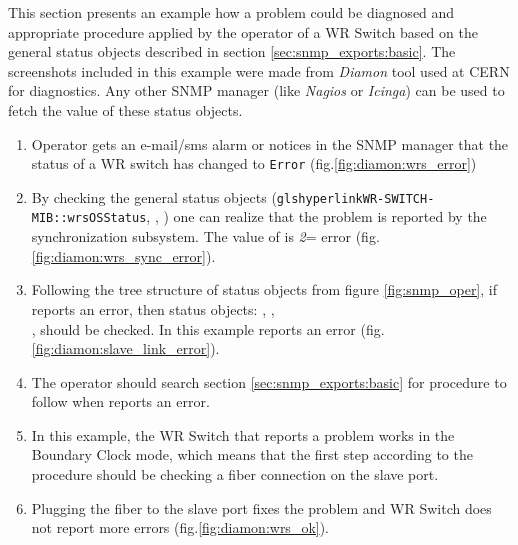 This section presents an example how a problem could be diagnosed and
appropriate procedure applied by the operator of a WR Switch based on the
general status objects described in section \ref{sec:snmp_exports:basic}. The
screenshots included in this example were made from \emph{Diamon} tool used at
CERN for diagnostics. Any other SNMP manager (like \emph{Nagios} or
\emph{Icinga}) can be used to fetch the value of these status objects.

\begin{enumerate}
  \item Operator gets an e-mail/sms alarm or notices in the SNMP manager that
    the status of a WR switch has changed to \texttt{Error}
    (fig.\ref{fig:diamon:wrs_error})
  \item By checking the general status objects
    (\texttt{glshyperlink{WR-SWITCH-MIB::wrsOSStatus}},
    \texttt{},
    \texttt{}) one can realize
    that the problem is reported by the synchronization subsystem. The value of
    \texttt{} is \emph{2}= error
    (fig.\ref{fig:diamon:wrs_sync_error}).
  \item Following the tree structure of status objects from figure
    \ref{fig:snmp_oper}, if
    \texttt{} reports an error,
    then status objects: \texttt{},
    \texttt{},\\
    \texttt{},
    \texttt{} should be
    checked. In this example
    \texttt{} reports an error
    (fig.\ref{fig:diamon:slave_link_error}).
  \item The operator should search section \ref{sec:snmp_exports:basic} for
    procedure to follow when
    \texttt{} reports an error.
  \item In this example, the WR Switch that reports a problem works in the
    Boundary Clock mode, which means that the first step according to the
    procedure should be checking a fiber connection on the slave port.
  \item Plugging the fiber to the slave port fixes the problem and WR Switch
    does not report more errors (fig.\ref{fig:diamon:wrs_ok}).
\end{enumerate}

